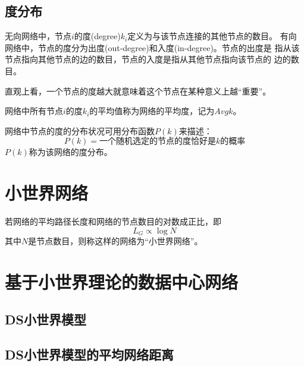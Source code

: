 \documentclass[bachelor,winfonts]{jnuthesis}
\begin{document}
    \subsection{度分布}
    
    \begin{definition}[度]
        无向网络中，节点$i$的度(degree)$k_i$定义为与该节点连接的其他节点的数目。
        有向网络中，节点的度分为出度(out-degree)和入度(in-degree)。节点的出度是
        指从该节点指向其他节点的边的数目，节点的入度是指从其他节点指向该节点的
        边的数目。
    \end{definition}
    
    直观上看，一个节点的度越大就意味着这个节点在某种意义上越“重要”。
    
    \begin{definition}[平均度]
        网络中所有节点$i$的度$k_i$的平均值称为网络的平均度，记为$Avg{k}$。
    \end{definition}
    
    \begin{definition}[度分布]
        网络中节点的度的分布状况可用分布函数$P(k)$来描述：
        \begin{equation}\label{eq:degree_distribution}
        P(k) = \text{一个随机选定的节点的度恰好是$k$的概率}
        \end{equation}
        $P(k)$称为该网络的度分布。
    \end{definition}
    
    \section{小世界网络}
    
    \begin{definition}[小世界网络]
        若网络的平均路径长度和网络的节点数目的对数成正比，即
        \[
        L_{G} \propto \log N
        \]
        其中$N$是节点数目，则称这样的网络为``小世界网络''。
    \end{definition}
    \blindtext
    
    \section{基于小世界理论的数据中心网络}
    \blindtext
    \subsection{DS小世界模型}
    \Blindtext
    \subsection{DS小世界模型的平均网络距离}
    \Blindtext
\end{document}
